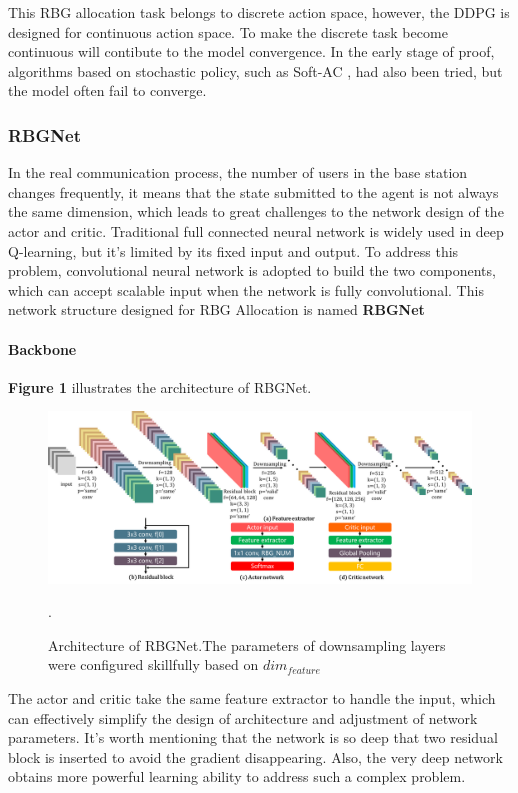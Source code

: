 \documentclass{article}
\begin{document}
This RBG allocation task belongs to discrete action space, however, the DDPG is designed for continuous action space.
To make the discrete task become continuous will contibute to the model convergence. 
In the early stage of proof, algorithms based on stochastic policy, such as Soft-AC \cite{HaarnojaSoft}, 
had also been tried, but the model often fail to converge.

\subsubsection{RBGNet}
In the real communication process, the number of users in the base station changes frequently, 
it means that the state submitted to the agent is not always the same dimension, which leads to great challenges to the network design of the actor and critic.
Traditional full connected neural network is widely used in deep Q-learning, but it's limited by its fixed input and output.
To address this problem, convolutional neural network is adopted to build the two components, 
which can accept scalable input when the network is fully convolutional. \cite{long2015fully}
This network structure designed for RBG Allocation is named \textbf{RBGNet}

\paragraph{Backbone}
\textbf{Figure 1} illustrates the architecture of RBGNet.
\begin{figure}[h]
\centering
\includegraphics[width=16cm]{RBGNet}
\caption{Architecture of RBGNet.The parameters of downsampling layers were configured skillfully based on $ dim_{feature} $ }.
\end{figure}
The actor and critic take the same feature extractor to handle the input, 
which can effectively simplify the design of architecture and adjustment of network parameters.
It's worth mentioning that the network is so deep that two residual block is inserted to avoid the gradient disappearing. \cite{He2016Deep}
Also, the very deep network obtains more powerful learning ability to address such a complex problem. 
\end{document}

